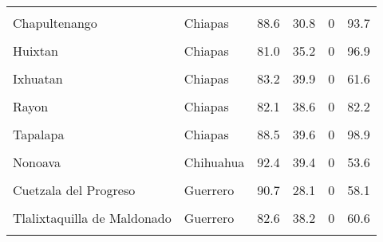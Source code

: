 \documentclass[
]{report}
\begin{document}
\begin{longtable}[t]{llrrrr}
\endfoot
\bottomrule
\endlastfoot
\cellcolor{gray!6}{El Bosque} & \cellcolor{gray!6}{Chiapas} & \cellcolor{gray!6}{75.6} & \cellcolor{gray!6}{34.9} & \cellcolor{gray!6}{0} & \cellcolor{gray!6}{98.1}\\
Chapultenango & Chiapas & 88.6 & 30.8 & 0 & 93.7\\
\cellcolor{gray!6}{Francisco Leon} & \cellcolor{gray!6}{Chiapas} & \cellcolor{gray!6}{80.3} & \cellcolor{gray!6}{35.6} & \cellcolor{gray!6}{0} & \cellcolor{gray!6}{84.3}\\
Huixtan & Chiapas & 81.0 & 35.2 & 0 & 96.9\\
\cellcolor{gray!6}{Huitiupan} & \cellcolor{gray!6}{Chiapas} & \cellcolor{gray!6}{77.2} & \cellcolor{gray!6}{36.2} & \cellcolor{gray!6}{0} & \cellcolor{gray!6}{92.3}\\
\addlinespace
Ixhuatan & Chiapas & 83.2 & 39.9 & 0 & 61.6\\
\cellcolor{gray!6}{Pantepec} & \cellcolor{gray!6}{Chiapas} & \cellcolor{gray!6}{75.2} & \cellcolor{gray!6}{35.4} & \cellcolor{gray!6}{0} & \cellcolor{gray!6}{66.8}\\
Rayon & Chiapas & 82.1 & 38.6 & 0 & 82.2\\
\cellcolor{gray!6}{Sabanilla} & \cellcolor{gray!6}{Chiapas} & \cellcolor{gray!6}{75.8} & \cellcolor{gray!6}{34.7} & \cellcolor{gray!6}{0} & \cellcolor{gray!6}{98.3}\\
Tapalapa & Chiapas & 88.5 & 39.6 & 0 & 98.9\\
\addlinespace
\cellcolor{gray!6}{Morelos} & \cellcolor{gray!6}{Chihuahua} & \cellcolor{gray!6}{83.1} & \cellcolor{gray!6}{30.2} & \cellcolor{gray!6}{0} & \cellcolor{gray!6}{51.3}\\
Nonoava & Chihuahua & 92.4 & 39.4 & 0 & 53.6\\
\cellcolor{gray!6}{Tierra Blanca} & \cellcolor{gray!6}{Guanajuato} & \cellcolor{gray!6}{93.4} & \cellcolor{gray!6}{33.5} & \cellcolor{gray!6}{0} & \cellcolor{gray!6}{76.9}\\
Cuetzala del Progreso & Guerrero & 90.7 & 28.1 & 0 & 58.1\\
\cellcolor{gray!6}{Martir de Cuilapan} & \cellcolor{gray!6}{Guerrero} & \cellcolor{gray!6}{75.4} & \cellcolor{gray!6}{49.7} & \cellcolor{gray!6}{0} & \cellcolor{gray!6}{69.7}\\
\addlinespace
Tlalixtaquilla de Maldonado & Guerrero & 82.6 & 38.2 & 0 & 60.6\\
\cellcolor{gray!6}{Alfajayucan} & \cellcolor{gray!6}{Hidalgo} & \cellcolor{gray!6}{97.0} & \cellcolor{gray!6}{38.9} & \cellcolor{gray!6}{0} & \cellcolor{gray!6}{68.9}\\

\end{longtable}
\end{document}
